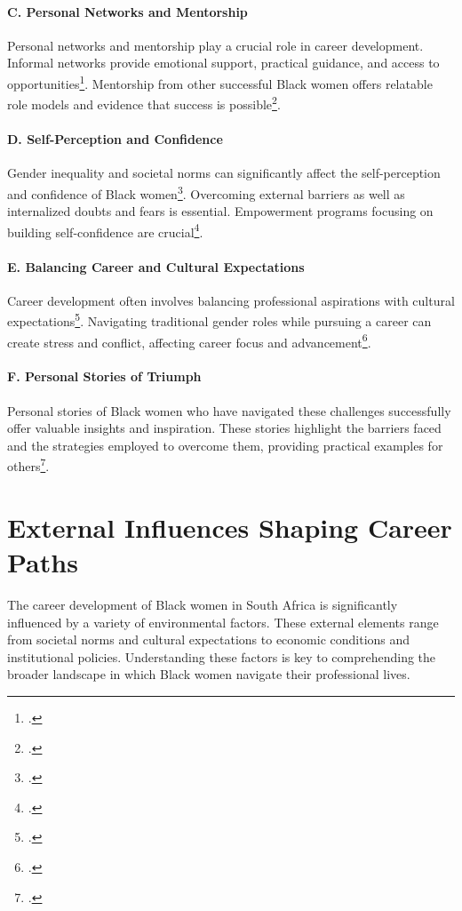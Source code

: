 \documentclass{article}
\begin{document}
\paragraph{C. Personal Networks and Mentorship}
Personal networks and mentorship play a crucial role in career development. Informal networks provide emotional support, practical guidance, and access to opportunities\footcite{riordan2011career}. Mentorship from other successful Black women offers relatable role models and evidence that success is possible\footcite{lumby2011women}.

\paragraph{D. Self-Perception and Confidence}
Gender inequality and societal norms can significantly affect the self-perception and confidence of Black women\footcite{rabe2012exploring}. Overcoming external barriers as well as internalized doubts and fears is essential. Empowerment programs focusing on building self-confidence are crucial\footcite{kokot1998effects}.

\paragraph{E. Balancing Career and Cultural Expectations}
Career development often involves balancing professional aspirations with cultural expectations\footcite{fenyes2000casualization}. Navigating traditional gender roles while pursuing a career can create stress and conflict, affecting career focus and advancement\footcite{gradin2018occupational}.

\paragraph{F. Personal Stories of Triumph}
Personal stories of Black women who have navigated these challenges successfully offer valuable insights and inspiration. These stories highlight the barriers faced and the strategies employed to overcome them, providing practical examples for others\footcite{matotoka2018transformative}.

\section{External Influences Shaping Career Paths}

The career development of Black women in South Africa is significantly influenced by a variety of environmental factors. These external elements range from societal norms and cultural expectations to economic conditions and institutional policies. Understanding these factors is key to comprehending the broader landscape in which Black women navigate their professional lives.
\end{document}
